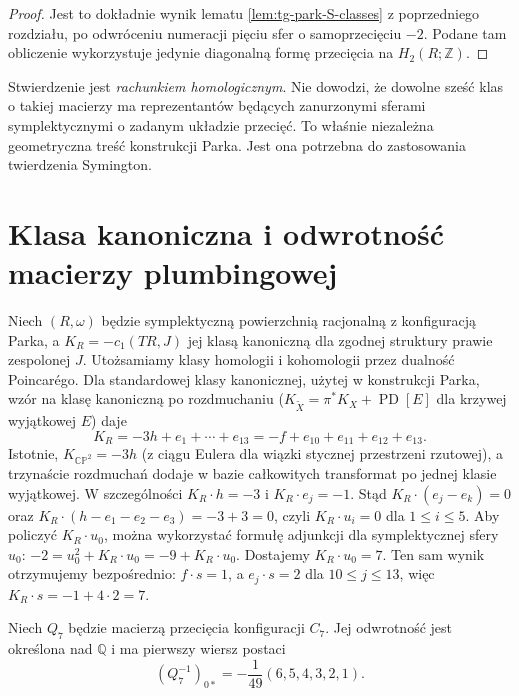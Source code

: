 \begin{proof}
Jest to dokładnie wynik lematu
\ref{lem:tg-park-S-classes} z poprzedniego rozdziału,
po odwróceniu numeracji pięciu sfer o samoprzecięciu $-2$.
Podane tam obliczenie wykorzystuje jedynie diagonalną
formę przecięcia na $H_2(R;\mathbb Z)$.
\end{proof}

\begin{uwaga}
Stwierdzenie jest \emph{rachunkiem homologicznym}.
Nie dowodzi, że dowolne sześć klas o takiej macierzy
ma reprezentantów będących zanurzonymi sferami
symplektycznymi o zadanym układzie przecięć.
To właśnie niezależna geometryczna treść konstrukcji Parka.
Jest ona potrzebna do zastosowania twierdzenia Symington.
\end{uwaga}

\section{Klasa kanoniczna i odwrotność macierzy plumbingowej}
\label{sec:tg-park14-canonical}

Niech $(R,\omega)$ będzie symplektyczną powierzchnią
racjonalną z konfiguracją Parka, a $K_R=-c_1(TR,J)$
jej klasą kanoniczną dla zgodnej struktury prawie
zespolonej $J$. Utożsamiamy klasy homologii i kohomologii
przez dualność Poincarégo. Dla standardowej klasy
kanonicznej, użytej w konstrukcji Parka, wzór na
klasę kanoniczną po rozdmuchaniu ($K_{\widetilde X}
=\pi^*K_X+\operatorname{PD}[E]$ dla krzywej
wyjątkowej $E$) daje
\[
K_R=-3h+e_1+\cdots+e_{13}
    =-f+e_{10}+e_{11}+e_{12}+e_{13}.
\]
Istotnie, $K_{\mathbb{CP}^2}=-3h$ (z ciągu
Eulera dla wiązki stycznej przestrzeni rzutowej),
a trzynaście rozdmuchań dodaje w bazie całkowitych
transformat po jednej klasie wyjątkowej.
W szczególności $K_R\cdot h=-3$ i
$K_R\cdot e_j=-1$. Stąd
$K_R\cdot(e_j-e_k)=0$ oraz
$K_R\cdot(h-e_1-e_2-e_3)=-3+3=0$,
czyli $K_R\cdot u_i=0$ dla $1\le i\le5$.
Aby policzyć $K_R\cdot u_0$, można wykorzystać
formułę adjunkcji dla symplektycznej sfery $u_0$:
$-2=u_0^2+K_R\cdot u_0=-9+K_R\cdot u_0$.
Dostajemy $K_R\cdot u_0=7$. Ten sam wynik otrzymujemy bezpośrednio:
$f\cdot s=1$, a $e_j\cdot s=2$ dla $10\le j\le13$,
więc $K_R\cdot s=-1+4\cdot2=7$.

\begin{lemat}
\label{lem:tg-park14-inverse}
Niech $Q_7$ będzie macierzą przecięcia konfiguracji $C_7$.
Jej odwrotność jest określona nad $\mathbb Q$ i ma pierwszy
wiersz postaci
\[
(Q_7^{-1})_{0*}=-\frac1{49}(6,5,4,3,2,1).
\]
\end{lemat}

